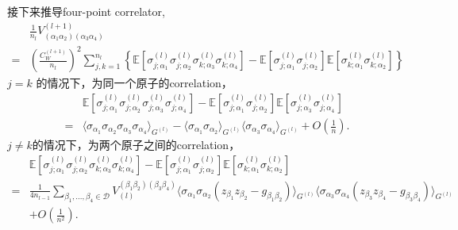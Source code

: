 接下来推导four-point correlator, 
\begin{equation}
    \begin{aligned}
        & \frac{1}{n_l}V_{(\alpha_1\alpha_2)(\alpha_3\alpha_4)}^{(l+1)} \\
        =& \left(\frac{C_W^{(l+1)}}{n_l}\right)^2\sum_{j,k=1}^{n_l}\left\{
            \mathbb{E}\left[\sigma_{j;\alpha_1}^{(l)}\sigma_{j;\alpha_2}^{(l)}
            \sigma_{k;\alpha_3}^{(l)}\sigma_{k;\alpha_4}^{(l)} \right]
            -\mathbb{E}\left[\sigma_{j;\alpha_1}^{(l)}\sigma_{j;\alpha_2}^{(l)}\right] 
            \mathbb{E}\left[\sigma_{k;\alpha_1}^{(l)}\sigma_{k;\alpha_2}^{(l)}\right]
            \right\}
    \end{aligned}
    \label{eq:ch4_4point_corr_layer_l}
\end{equation}
$j=k$ 的情况下，为同一个原子的correlation，
\begin{equation}
    \begin{aligned}
    &\mathbb{E}\left[\sigma_{j;\alpha_1}^{(l)}\sigma_{j;\alpha_2}^{(l)}
    \sigma_{j;\alpha_3}^{(l)}\sigma_{j;\alpha_4}^{(l)} \right]
    - \mathbb{E}\left[\sigma_{j;\alpha_1}^{(l)}\sigma_{j;\alpha_2}^{(l)}\right] 
    \mathbb{E}\left[\sigma_{j;\alpha_3}^{(l)}\sigma_{j;\alpha_4}^{(l)}\right] \\
    =& \langle\sigma_{\alpha_1}\sigma_{\alpha_2}\sigma_{\alpha_3}\sigma_{\alpha_4}
    \rangle_{G^{(l)}} - \langle\sigma_{\alpha_1}\sigma_{\alpha_2}\rangle_{G^{(l)}}
    \langle\sigma_{\alpha_3}\sigma_{\alpha_4}\rangle_{G^{(l)}} + 
    O\left(\frac{1}{n}\right).
    \end{aligned}
\end{equation}
$j\neq k$的情况下，为两个原子之间的correlation，
\begin{equation}
    \begin{aligned}
    &\mathbb{E}\left[\sigma_{j;\alpha_1}^{(l)}\sigma_{j;\alpha_2}^{(l)}
    \sigma_{k;\alpha_3}^{(l)}\sigma_{k;\alpha_4}^{(l)} \right] - 
    \mathbb{E}\left[\sigma_{j;\alpha_1}^{(l)}\sigma_{j;\alpha_2}^{(l)}\right]
    \mathbb{E}\left[\sigma_{k;\alpha_1}^{(l)}\sigma_{k;\alpha_2}^{(l)}\right] \\
    =& \frac{1}{4n_{l-1}}\sum_{\beta_1,...,\beta_4\in \mathcal{D}} 
    V_{(l)}^{(\beta_1\beta_2)(\beta_3\beta_4)}\langle\sigma_{\alpha_1}\sigma_{\alpha_2}
    (z_{\beta_1}z_{\beta_2} - g_{\beta_1\beta_2})\rangle_{G^{(l)}}
    \langle\sigma_{\alpha_3}\sigma_{\alpha_4} (z_{\beta_3}z_{\beta_4} - 
    g_{\beta_3\beta_4})\rangle_{G^{(l)}} \\
    & + O\left(\frac{1}{n^2}\right).
    \end{aligned}
\end{equation}

